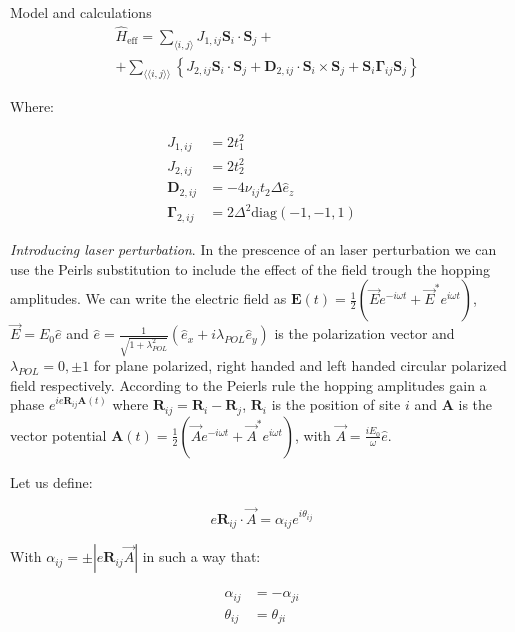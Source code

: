\documentclass[aps,prl,twocolumn,amsmath,amssymb,superscriptaddress,nobibnotes]{revtex4-1}%
\newcommand{\n}{\nonumber}
\newcommand{\bs}{\boldsymbol}
\begin{document}
\begin{section}{Model and calculations}
\begin{align}
\label{MKMHeff0}
&\hat{H}_{\text{eff}} = \sum_{\langle i,j \rangle} J_{1,ij}\bs{S}_i\cdot\bs{S}_j +\n \\
&+ \sum_{\langle \langle i,j \rangle \rangle} \left\{ J_{2,ij}\bs{S}_i\cdot\bs{S}_j + \bs{D}_{2,ij}\cdot \bs{S}_i \times \bs{S}_j + \bs{S}_i \bs{\Gamma}_{ij} \bs{S}_j \right\}
\end{align}

Where:

\begin{align*}
J_{1,ij} &= 2t_1^2 \\
J_{2,ij} &= 2t_2^2 \\
\bs{D}_{2,ij} &= - 4\nu_{ij} t_2 \Delta \hat{e}_z \\
\bs{\Gamma}_{2,ij} &= 2\Delta^2 \text{diag}(-1,-1,1)
\end{align*}

\textit{Introducing laser perturbation}. In the prescence of an laser perturbation we can use the Peirls substitution to include the effect of the field trough the hopping amplitudes. We can write the electric field as $\bs{E}(t) = \frac{1}{2}(\vec{E}e^{-i\omega t}+\vec{E}^*e^{i\omega t})$, $\vec{E} = E_0\hat{e}$ and $\hat{e} = \frac{1}{\sqrt{1+\lambda_{POL}^2}}(\hat{e}_x+i\lambda_{POL}\hat{e}_y)$ is the polarization vector and $\lambda_{POL} = 0, \pm 1$ for plane polarized, right handed and left handed circular polarized field respectively. According to the Peierls rule the hopping amplitudes gain a phase $e^{ie\bs{R}_{ij}\bs{A}(t)}$ where $\bs{R}_{ij} = \bs{R}_i-\bs{R}_j$, $\bs{R}_i$ is the position of site $i$ and $\bs{A}$ is the vector potential $\bs{A}(t) = \frac{1}{2}(\vec{A}e^{-i\omega t} + \vec{A}^* e^{i\omega t})$, with $\vec{A} = \frac{iE_0}{\omega}\hat{e}$.

Let us define:

\begin{equation}
\label{Def_alpha}
e\bs{R}_{ij}\cdot\vec{A} = \alpha_{ij} e^{i \theta_{ij}}
\end{equation}

With $\alpha_{ij} = \pm|e\bs{R}_{ij}\vec{A}|$ in such a way that:

\begin{align}
\alpha_{ij} &= -\alpha_{ji} \label{alphaSym} \\
\theta_{ij} &= \theta_{ji} \label{thetaSym}
\end{align}


\end{section}
\end{document}

